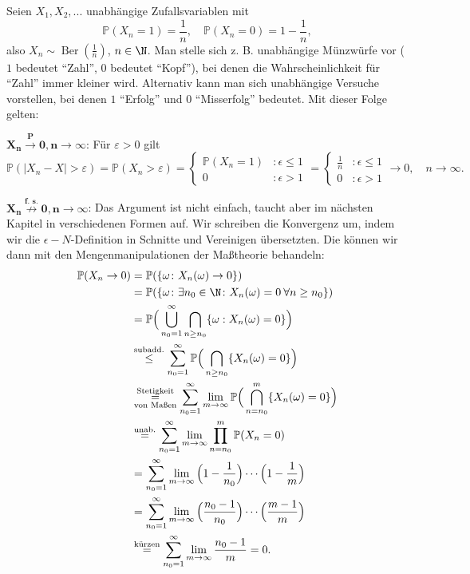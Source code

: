 \begin{beispiel}\label{Adam}
	Seien $X_1, X_2, ... $ unabh\"angige Zufallsvariablen mit $$\mathbb{P}(X_n = 1) = \frac{1}{n}, \quad \mathbb{P}(X_n = 0) = 1 - \frac{1}{n},$$ also $X_n \sim \operatorname{Ber}(\frac{1}{n})$, $n \in \N$. Man stelle sich z. B. unabh\"angige M\"unzw\"urfe vor ($1$ bedeutet \enquote{Zahl}, $0$ bedeutet \enquote{Kopf}), bei denen die Wahrscheinlichkeit f\"ur \enquote{Zahl} immer kleiner wird. Alternativ kann man sich unabh\"angige Versuche vorstellen, bei denen $1$ \enquote{Erfolg} und $0$ \enquote{Misserfolg} bedeutet. Mit dieser Folge gelten:\smallskip
	
	$\mathbf{X_n \overset{P}{\longrightarrow}0, n \to \infty}$:
	Für $\varepsilon > 0$ gilt 
	\[ \mathbb{P}(|X_n - X| > \varepsilon) = \mathbb{P}(X_n > \varepsilon) = 
	\begin{cases} 
	\mathbb{P}(X_n = 1)&: \epsilon\leq 1\\
	0&: \epsilon> 1
	\end{cases}
	 = 
	 \begin{cases}
		 \frac{1}{n}&: \epsilon\leq 1\\
		 0 &: \epsilon >1
	\end{cases}	 
		 \to 0, \quad n \to \infty.
		  \]
	
	$\mathbf{X_n \overset{\text{f. s.}}{\not\longrightarrow}0, n \to \infty}$: Das Argument ist nicht einfach, taucht aber im n\"achsten Kapitel in verschiedenen Formen auf. Wir schreiben die Konvergenz um, indem wir die $\epsilon-N$-Definition in Schnitte und Vereinigen \"ubersetzten. Die k\"onnen wir dann mit den Mengenmanipulationen der Ma\ss theorie behandeln:
	\begin{align*}
		\mathbb{P}(X_n \to 0) &= \mathbb{P}(\{ \omega\colon X_n(\omega) \to 0 \})\\
		& = \mathbb{P}(\{ \omega\colon \exists n_0 \in \N \colon X_n(\omega) = 0 \: \forall n \geq n_0 \})\\
		&= \mathbb{P}\Big(\bigcup_{n_0 = 1}^{\infty} \bigcap_{n \geq n_0} \{ \omega: X_n(\omega) = 0 \}\Big)\\
		& \overset{\text{subadd.}}{\leq} \sum\limits_{n_0 = 1}^{\infty} \mathbb{P}\Big(\bigcap_{n \geq n_0} \{ X_n(\omega) = 0 \}\Big)\\
		& \overset{\text{Stetigkeit}}{\underset{\text{von Maßen}}{=}}\sum\limits_{n_0 = 1}^{\infty} \lim_{m\to\infty}  \mathbb{P}\Big(\bigcap_{n = n_0}^m \{ X_n(\omega) = 0 \}\Big)\\
		& \overset{\text{unab.}}{=} \sum\limits_{n_0 = 1}^{\infty} \lim_{m\to\infty} \prod_{n=n_0}^m \mathbb{P}(X_n = 0)\\
		& = \sum\limits_{n_0 = 1}^{\infty} \lim_{m\to\infty}  \Big(1-\frac{1}{n_0}\Big)\cdots \Big(1-\frac{1}{m}\Big)\\
		& = \sum\limits_{n_0 = 1}^{\infty} \lim_{m\to\infty}  \Big(\frac{n_0-1}{n_0}\Big)\cdots \Big(\frac{m-1}{m}\Big)\\
		& \overset{\text{k\"urzen}}{=} \sum\limits_{n_0 = 1}^{\infty} \lim_{m\to\infty}  \frac{n_0-1}{m}=0.
	\end{align*}
\end{beispiel}

